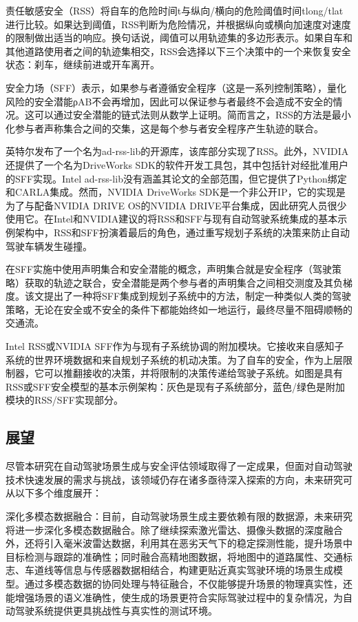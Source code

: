 责任敏感安全（RSS）将自车的危险时间t与纵向/横向的危险阈值时间tlong/tlat进行比较。如果达到阈值，RSS判断为危险情况，并根据纵向或横向加速度对速度的限制做出适当的响应。换句话说，阈值可以用轨迹集的多边形表示。如果自车和其他道路使用者之间的轨迹集相交，RSS会选择以下三个决策中的一个来恢复安全状态：刹车，继续前进或开车离开。

安全力场（SFF）表示，如果参与者遵循安全程序（这是一系列控制策略），量化风险的安全潜能ρAB不会再增加，因此可以保证参与者最终不会造成不安全的情况。这可以通过安全潜能的链式法则从数学上证明。简而言之，RSS的方法是最小化参与者声称集合之间的交集，这是每个参与者安全程序产生轨迹的联合。

英特尔发布了一个名为ad-rss-lib的开源库，该库部分实现了RSS。此外，NVIDIA还提供了一个名为DriveWorks SDK的软件开发工具包，其中包括针对经批准用户的SFF实现。Intel ad-rss-lib没有涵盖其论文的全部范围，但它提供了Python绑定和CARLA集成。然而，NVIDIA DriveWorks SDK是一个非公开IP，它的实现是为了与配备NVIDIA DRIVE OS的NVIDIA DRIVE平台集成，因此研究人员很少使用它。在Intel和NVIDIA建议的将RSS和SFF与现有自动驾驶系统集成的基本示例架构中，RSS和SFF扮演着最后的角色，通过重写规划子系统的决策来防止自动驾驶车辆发生碰撞。

在SFF实施中使用声明集合和安全潜能的概念，声明集合就是安全程序（驾驶策略）获取的轨迹之联合，安全潜能是两个参与者的声明集合之间相交测度及其负梯度。该文提出了一种将SFF集成到规划子系统中的方法，制定一种类似人类的驾驶策略，无论在安全或不安全的条件下都能始终如一地运行，最终尽量不阻碍顺畅的交通流。

Intel RSS或NVIDIA SFF作为与现有子系统协调的附加模块。它接收来自感知子系统的世界环境数据和来自规划子系统的机动决策。为了自车的安全，作为上层限制器，它可以推翻接收的决策，并将限制的决策传递给驾驶子系统。如图是具有RSS或SFF安全模型的基本示例架构：灰色是现有子系统部分，蓝色/绿色是附加模块的RSS/SFF实现部分。

\subsection{展望}


尽管本研究在自动驾驶场景生成与安全评估领域取得了一定成果，但面对自动驾驶技术快速发展的需求与挑战，该领域仍存在诸多亟待深入探索的方向，未来研究可从以下多个维度展开：​

深化多模态数据融合：目前，自动驾驶场景生成主要依赖有限的数据源，未来研究将进一步深化多模态数据融合。除了继续探索激光雷达、摄像头数据的深度融合外，还将引入毫米波雷达数据，利用其在恶劣天气下的稳定探测性能，提升场景中目标检测与跟踪的准确性；同时融合高精地图数据，将地图中的道路属性、交通标志、车道线等信息与传感器数据相结合，构建更贴近真实驾驶环境的场景生成模型。通过多模态数据的协同处理与特征融合，不仅能够提升场景的物理真实性，还能增强场景的语义准确性，使生成的场景更符合实际驾驶过程中的复杂情况，为自动驾驶系统提供更具挑战性与真实性的测试环境。​

